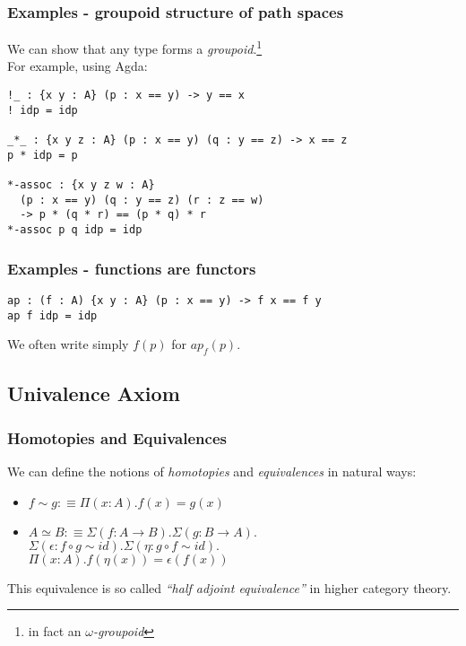 \documentclass[dvipdfmx]{beamer}
\begin{document}
\begin{frame}[containsverbatim]
  \frametitle{Examples - groupoid structure of path spaces}
  We can show that any type forms a {\it groupoid}.\footnote{
    in fact an {\it $\omega$-groupoid}}
  \\
  For example, using Agda:

  \begin{verbatim}
!_ : {x y : A} (p : x == y) -> y == x
! idp = idp

_*_ : {x y z : A} (p : x == y) (q : y == z) -> x == z
p * idp = p

*-assoc : {x y z w : A}
  (p : x == y) (q : y == z) (r : z == w)
  -> p * (q * r) == (p * q) * r
*-assoc p q idp = idp
  \end{verbatim}
\end{frame}

\begin{frame}[containsverbatim]
  \frametitle{Examples - functions are functors}
  \begin{verbatim}
ap : (f : A) {x y : A} (p : x == y) -> f x == f y
ap f idp = idp
  \end{verbatim}
  We often write simply
  $f \left( p \right)$
  for $ap_f \left( p \right)$.
\end{frame}

\subsection{Univalence Axiom}

\begin{frame}
  \frametitle{Homotopies and Equivalences}
  We can define the notions of {\it homotopies} and {\it equivalences}
  in natural ways:
  \begin{itemize}
      \pause
    \item
    $f \sim g :\equiv \Pi \left( x : A \right) .
    f \left( x \right) = g \left( x \right)$
    \pause
    \item
    $A \simeq B :\equiv \Sigma \left( f : A \to B \right) .
    \Sigma \left( g : B \to A \right) .$ \\
    $\Sigma \left( \epsilon : f \circ g \sim id \right) .
    \Sigma \left( \eta : g \circ f \sim id \right) .$ \\
    $\Pi \left( x : A \right) .
    f \left( \eta \left( x \right) \right) = \epsilon \left( f \left( x \right) \right)$
  \end{itemize}
  \pause
  This equivalence is so called {\it ``half adjoint equivalence''}
  in higher category theory.
\end{frame}
\end{document}
